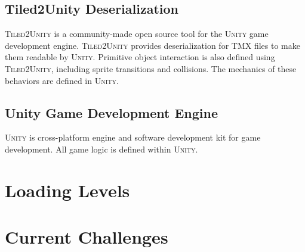 \documentclass{article}
\begin{document}
\subsection{Tiled2Unity Deserialization}
\textsc{Tiled2Unity} is a community-made open source tool for the \textsc{Unity} game development engine.
\textsc{Tiled2Unity} provides deserialization for TMX files to make them readable by \textsc{Unity}. Primitive object
interaction is also defined using \textsc{Tiled2Unity}, including sprite transitions and collisions. The mechanics of
these behaviors are defined in \textsc{Unity}.

\subsection{Unity Game Development Engine}
\textsc{Unity} is cross-platform engine and software development kit for game development. All game logic is defined
within \textsc{Unity}.

\section{Loading Levels}

\section{Current Challenges}

\end{document}
